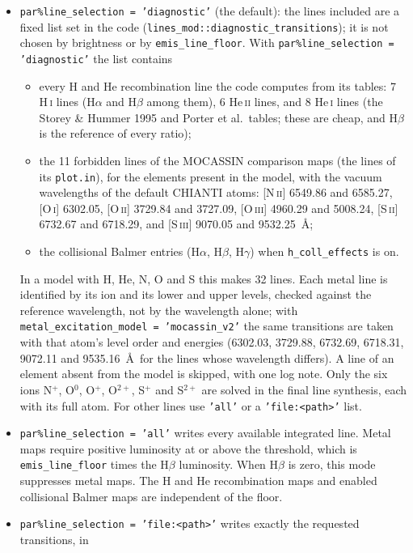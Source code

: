 \documentclass[english,a4paper]{my_memo}
\newcommand{\code}[1]{\texttt{#1}}
\begin{document}
\begin{itemize}
\item \code{par\%line\_selection = 'diagnostic'} (the default): the lines
included are a fixed list set in the code
(\code{lines\_mod::diagnostic\_transitions}); it is not chosen by
brightness or by \code{emis\_line\_floor}. With
\code{par\%line\_selection = 'diagnostic'} the list contains
  \begin{itemize}
  \item every H and He recombination line the code computes from its tables:
  7 H\,\textsc{i} lines (H$\alpha$ and H$\beta$ among them), 6 He\,\textsc{ii}
  lines, and 8 He\,\textsc{i} lines (the Storey \& Hummer 1995 and Porter et
  al.\ tables; these are cheap, and H$\beta$ is the reference of every ratio);
  \item the 11 forbidden lines of the MOCASSIN comparison maps (the lines of
  its \code{plot.in}), for the elements present in the model, with the
  vacuum wavelengths of the default CHIANTI atoms:
  [N\,\textsc{ii}] 6549.86 and 6585.27,
  [O\,\textsc{i}] 6302.05,
  [O\,\textsc{ii}] 3729.84 and 3727.09,
  [O\,\textsc{iii}] 4960.29 and 5008.24,
  [S\,\textsc{ii}] 6732.67 and 6718.29, and
  [S\,\textsc{iii}] 9070.05 and 9532.25~\AA;
  \item the collisional Balmer entries (H$\alpha$, H$\beta$, H$\gamma$) when
  \code{h\_coll\_effects} is on.
  \end{itemize}
In a model with H, He, N, O and S this makes 32 lines. Each metal line is
identified by its ion and its lower and upper levels, checked against the
reference wavelength, not by the wavelength alone; with
\code{metal\_excitation\_model = 'mocassin\_v2'} the same transitions are
taken with that atom's level order and energies (6302.03, 3729.88, 6732.69,
6718.31, 9072.11 and 9535.16~\AA\ for the lines whose wavelength differs).
A line of an element absent from the model is skipped, with one log note.
Only the six ions N$^{+}$, O$^{0}$, O$^{+}$, O$^{2+}$, S$^{+}$ and S$^{2+}$ are
solved in the final line synthesis, each with its full atom. For other lines
use \code{'all'} or a \code{'file:<path>'} list.
\item \code{par\%line\_selection = 'all'} writes every available integrated line. Metal maps
require positive luminosity at or above the threshold, which is
\code{emis\_line\_floor} times the H$\beta$ luminosity.
When H$\beta$ is zero, this mode suppresses metal maps. The H and He
recombination maps and enabled collisional Balmer maps are independent of the floor.
\item \code{par\%line\_selection = 'file:<path>'} writes exactly the requested transitions, in

\end{itemize}
\end{document}
